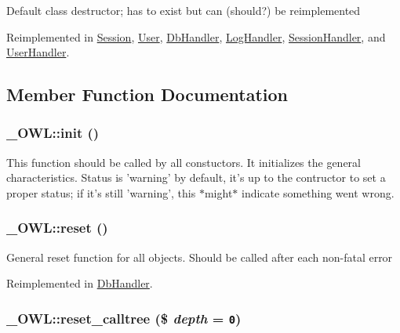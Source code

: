 Default class destructor; has to exist but can (should?) be reimplemented 

Reimplemented in \hyperlink{classSession_a498272c85524e4700abc3363883165b}{Session}, \hyperlink{classUser_ccd20149a7414612c1505e022eb63ffc}{User}, \hyperlink{classDbHandler_7cd6bd727d1f296eb5dbfae6ca36ab3f}{DbHandler}, \hyperlink{classLogHandler_acd0c653489cf221423b9edd62e81458}{LogHandler}, \hyperlink{classSessionHandler_461097c3ee6b1aecf833ce1225d02329}{SessionHandler}, and \hyperlink{classUserHandler_3e1f6381ed79caf6e1a255fb0a9cc386}{UserHandler}.

\subsection{Member Function Documentation}
\hypertarget{class__OWL_e0ef3ded56e8a6b34b6461e5a721cd3e}{
\subsubsection{\setlength{\rightskip}{0pt plus 5cm}\_\-OWL::init ()}}
\label{class__OWL_e0ef3ded56e8a6b34b6461e5a721cd3e}


This function should be called by all constuctors. It initializes the general characteristics. Status is 'warning' by default, it's up to the contructor to set a proper status; if it's still 'warning', this $\ast$might$\ast$ indicate something went wrong. \hypertarget{class__OWL_2f2a042bcf31965194c03033df0edc9b}{
\subsubsection{\setlength{\rightskip}{0pt plus 5cm}\_\-OWL::reset ()}}
\label{class__OWL_2f2a042bcf31965194c03033df0edc9b}


General reset function for all objects. Should be called after each non-fatal error 

Reimplemented in \hyperlink{classDbHandler_9982df4830f05803935bb31bac7fae3d}{DbHandler}.\hypertarget{class__OWL_91389e63fc76f6513147f302cbd92a2e}{
\subsubsection{\setlength{\rightskip}{0pt plus 5cm}\_\-OWL::reset\_\-calltree (\$ {\em depth} = {\tt 0})}}
\label{class__OWL_91389e63fc76f6513147f302cbd92a2e}


